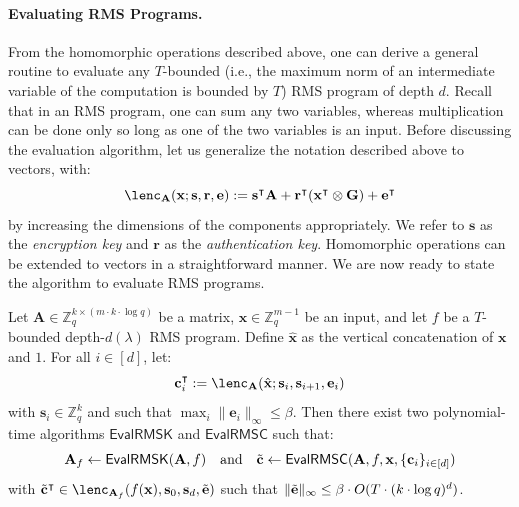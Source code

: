 \documentclass{theoretics}
\newcommand{\Z}{\mathbb{Z}}
\renewcommand{\sec}{\ensuremath{\lambda}}
\newcommand{\algofont}[1]{\ensuremath{\mathsf{#1}}}
\newcommand{\Eval}{\algofont{Eval}\xspace}
\begin{document}
\paragraph{Evaluating RMS Programs.} From the homomorphic operations described above, one can derive a general routine to evaluate any $T$-bounded (i.e., the maximum norm of an intermediate variable of the computation is bounded by $T$) RMS program of depth $d$. Recall that in an RMS program, one can sum any two variables, whereas multiplication can be done only so long as one of the two variables is an input. Before discussing the evaluation algorithm, let us generalize the notation described above to vectors, with:
\[
\lenc_\mathbf{A} (\mathbf{x};\mathbf{s}, \mathbf{r}, \mathbf{e}) := \mathbf{s}^\intercal\mathbf{A}+\mathbf{r}^\intercal (\mathbf{x}^\intercal\otimes\mathbf{G})+\mathbf{e}^\intercal
\]
by increasing the dimensions of the components appropriately. We refer to $\mathbf{s}$ as the \emph{encryption key} and $\mathbf{r}$ as the \emph{authentication key}. Homomorphic operations can be extended to vectors in a straightforward manner. We are now ready to state the algorithm to evaluate RMS programs. 

\begin{lemma}
\label{evalRMS}
Let $\mathbf{A}\in\Z_q^{k\times (m\cdot k\cdot \log q)}$ be a matrix, $\mathbf{x}\in\Z_q^{m-1}$ be an input, and let $f$ be a $T$-bounded depth-$d(\sec)$ RMS program. Define $\hat{\mathbf{x}}$ as the vertical concatenation of $\mathbf{x}$ and $1$.
For all $i\in[d]$, let:
\[
\mathbf{c}_i^\intercal := \lenc_{\mathbf{A}}(\hat{\mathbf{x}}; \mathbf{s}_i, \mathbf{s}_{i+1}, \mathbf{e}_i)
\]
with $\mathbf{s}_i\in \Z_q^k$ and such that $\max_i \|\mathbf{e}_i\|_\infty \leq \beta$. Then there exist two polynomial-time algorithms $\Eval\mathsf{RMSK}$ and $\Eval\mathsf{RMSC}$ such that:
\[
\mathbf{A}_f\gets \Eval\mathsf{RMSK}(\mathbf{A}, f) \quad\text{and}\quad
\Tilde{\mathbf{c}}\gets \Eval\mathsf{RMSC}(\mathbf{A}, f, \mathbf{x}, \{\mathbf{c}_i\}_{i\in [d]})
\]
with $\Tilde{\mathbf{c}}^\intercal \in \lenc_{\mathbf{A}_f}(f(\mathbf{x}), \mathbf{s}_0, \mathbf{s}_d, \Tilde{\mathbf{e}})$ such that $\|\Tilde{\mathbf{e}}\|_\infty \leq \beta \cdot O(T \cdot (k\cdot \log q)^d)$.
\end{lemma}
\end{document}
